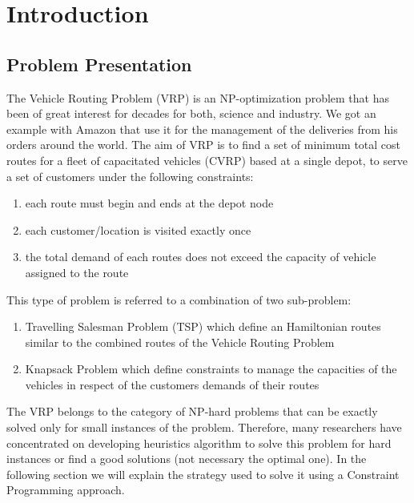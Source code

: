 \chapter{Introduction}
\section{Problem Presentation}
The Vehicle Routing Problem (VRP) is an NP-optimization problem that has been of great interest for decades for both, science and industry. We got an example with Amazon that use it for the management of the deliveries from his orders around the world. The aim of VRP is to find a set of minimum total cost routes for a fleet of capacitated vehicles (CVRP) based at a single depot, to serve a set of customers under the following constraints:
\begin{enumerate}
    \item each route must begin and ends at the depot node
    \item each customer/location is visited exactly once
    \item the total demand of each routes does not exceed the capacity of vehicle assigned to the route
\end{enumerate}
This type of problem is referred to a combination of two sub-problem:
\begin{enumerate}
    \item Travelling Salesman Problem (TSP) which define an Hamiltonian routes similar to the combined routes of the Vehicle Routing Problem
    \item Knapsack Problem which define constraints to manage the capacities of the vehicles in respect of the customers demands of their routes
\end{enumerate}
The VRP belongs to the category of NP-hard problems that can be exactly solved only for small instances of the problem. Therefore, many researchers have concentrated on developing heuristics algorithm to solve this problem for hard instances or find a good solutions (not necessary the optimal one). In the following section we will explain the strategy used to solve it using a Constraint Programming approach.
\newpage
